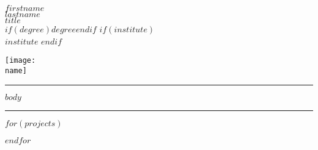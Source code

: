 \documentclass[11pt,A4]{article}
\let\OldRule\rule
\renewcommand{\rule}[2]{\OldRule{\linewidth}{#2}}
\def\name{$firstname$ $lastname$}
\begin{document}
\begin{minipage}{0.6\textwidth}
  {\fontsize{36}{44}\selectfont
  \textbf{\MakeUppercase{$firstname$}}
  \\[18pt]
  \textbf{\MakeUppercase{$lastname$}}}
  \\[13pt]
  {\color{Redish}
  {\fontsize{14}{18}\selectfont
  \textbf{\MakeUppercase{$title$}}}}
  \\[7pt]
  {\fontsize{12}{15}\selectfont
  $if(degree)$$degree$$endif$
  $if(institute)$
    \\[2pt]
    $institute$
  $endif$
  }
\end{minipage}
{\color{PrettyGray}{\vrule width 2pt}}
\begin{minipage}{0.4\textwidth}

  \begingroup
  \leftskip=20pt
  \texttt{[image: \\name]}
  \par
  \endgroup

\end{minipage}

\vspace{0.4cm}

\noindent\textcolor{AlmostBlack}{\rule{}{0.5mm}}

$body$

\noindent\textcolor{AlmostBlack}{\rule{}{0.5mm}}

\fontsize{12}{15}\selectfont{Projects}

$for(projects)$
  \addtocounter{AmountOfProjects}{1}
$endfor$

\end{document}
